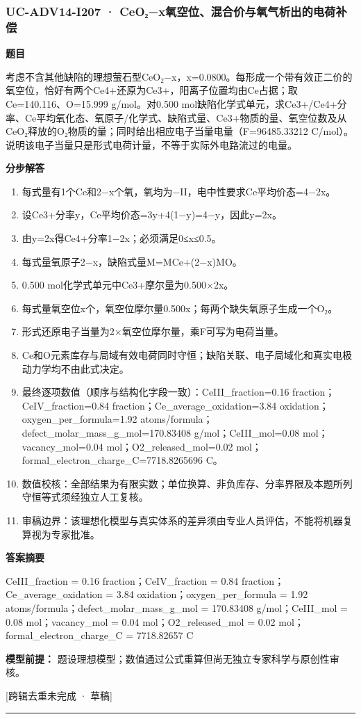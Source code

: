 \documentclass[UTF8,11pt,a4paper]{ctexart}
\begin{document}
\subsubsection*{UC-ADV14-I207 · CeO₂−x氧空位、混合价与氧气析出的电荷补偿}
\noindent\textbf{题目}\par
考虑不含其他缺陷的理想萤石型CeO₂−x，x=0.0800。每形成一个带有效正二价的氧空位，恰好有两个Ce4+还原为Ce3+，阳离子位置均由Ce占据；取Ce=140.116、O=15.999 g/mol。对0.500 mol缺陷化学式单元，求Ce3+/Ce4+分率、Ce平均氧化态、氧原子/化学式、缺陷式量、Ce3+物质的量、氧空位数及从CeO₂释放的O₂物质的量；同时给出相应电子当量电量（F=96485.33212 C/mol）。说明该电子当量只是形式电荷计量，不等于实际外电路流过的电量。\par
\medskip\noindent\textbf{分步解答}
\begin{enumerate}
\item 每式量有1个Ce和2−x个氧，氧均为−II，电中性要求Ce平均价态=4−2x。
\item 设Ce3+分率y，Ce平均价态=3y+4(1−y)=4−y，因此y=2x。
\item 由y=2x得Ce4+分率1−2x；必须满足0≤x≤0.5。
\item 每式量氧原子2−x，缺陷式量M=MCe+(2−x)MO。
\item 0.500 mol化学式单元中Ce3+摩尔量为0.500×2x。
\item 每式量氧空位x个，氧空位摩尔量0.500x；每两个缺失氧原子生成一个O₂。
\item 形式还原电子当量为2×氧空位摩尔量，乘F可写为电荷当量。
\item Ce和O元素库存与局域有效电荷同时守恒；缺陷关联、电子局域化和真实电极动力学均不由此式决定。
\item 最终逐项数值（顺序与结构化字段一致）：CeIII\_fraction=0.16 fraction；CeIV\_fraction=0.84 fraction；Ce\_average\_oxidation=3.84 oxidation；oxygen\_per\_formula=1.92 atoms/formula；defect\_molar\_mass\_g\_mol=170.83408 g/mol；CeIII\_mol=0.08 mol；vacancy\_mol=0.04 mol；O2\_released\_mol=0.02 mol；formal\_electron\_charge\_C=7718.8265696 C。
\item 数值校核：全部结果为有限实数；单位换算、非负库存、分率界限及本题所列守恒等式须经独立人工复核。
\item 审稿边界：该理想化模型与真实体系的差异须由专业人员评估，不能将机器复算视为专家批准。
\end{enumerate}
\noindent\textbf{答案摘要}\par
CeIII\_fraction = 0.16 fraction；CeIV\_fraction = 0.84 fraction；Ce\_average\_oxidation = 3.84 oxidation；oxygen\_per\_formula = 1.92 atoms/formula；defect\_molar\_mass\_g\_mol = 170.83408 g/mol；CeIII\_mol = 0.08 mol；vacancy\_mol = 0.04 mol；O2\_released\_mol = 0.02 mol；formal\_electron\_charge\_C = 7718.82657 C\par
\noindent\textbf{模型前提：}
题设理想模型；数值通过公式重算但尚无独立专家科学与原创性审核。\par
\noindent\textcolor{red!65!black}{[跨辑去重未完成 · 草稿]} \par
\medskip\hrule\medskip
{}
\end{document}
